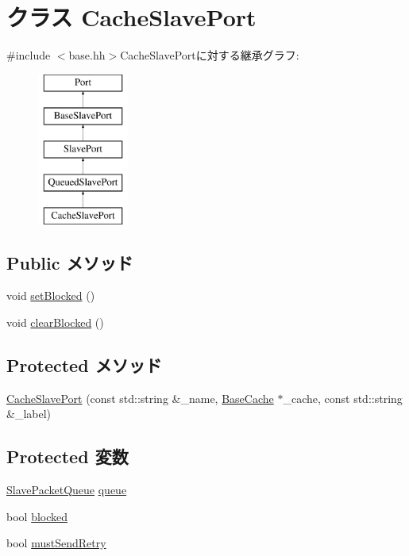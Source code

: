 \hypertarget{classBaseCache_1_1CacheSlavePort}{
\section{クラス CacheSlavePort}
\label{classBaseCache_1_1CacheSlavePort}
}


{\ttfamily \#include $<$base.hh$>$}CacheSlavePortに対する継承グラフ:\begin{figure}[H]
\begin{center}
\leavevmode
\includegraphics[height=5cm]{classBaseCache_1_1CacheSlavePort}
\end{center}
\end{figure}
\subsection*{Public メソッド}
\begin{DoxyCompactItemize}
\item 
void \hyperlink{classBaseCache_1_1CacheSlavePort_a357d28c375cfa16d73f0cc0dd9a6dd65}{setBlocked} ()
\item 
void \hyperlink{classBaseCache_1_1CacheSlavePort_a67086ab888a89c3dbb6feaf48d83861b}{clearBlocked} ()
\end{DoxyCompactItemize}
\subsection*{Protected メソッド}
\begin{DoxyCompactItemize}
\item 
\hyperlink{classBaseCache_1_1CacheSlavePort_abfe2d39a27aaadaf48dec012af6e65e8}{CacheSlavePort} (const std::string \&\_\-name, \hyperlink{classBaseCache_1_1BaseCache}{BaseCache} $\ast$\_\-cache, const std::string \&\_\-label)
\end{DoxyCompactItemize}
\subsection*{Protected 変数}
\begin{DoxyCompactItemize}
\item 
\hyperlink{classSlavePacketQueue}{SlavePacketQueue} \hyperlink{classBaseCache_1_1CacheSlavePort_a3055168363a9ed42f38173363b6c1975}{queue}
\item 
bool \hyperlink{classBaseCache_1_1CacheSlavePort_adf1dca7698b030895e9d81fc14cd9fd8}{blocked}
\item 
bool \hyperlink{classBaseCache_1_1CacheSlavePort_a63c00ff638681c3fdbaff0e3002674cd}{mustSendRetry}
\end{DoxyCompactItemize}
